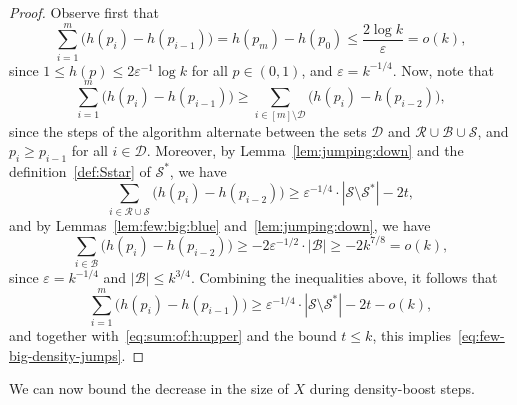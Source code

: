 \documentclass[12pt,reqno]{amsart}
\theoremstyle{definition}
\theoremstyle{remark}
\newcommand\cB{\mathcal{B}}
\def\cS{\mathcal{S}}
\newcommand\eps{\varepsilon}
\renewcommand{\le}{\leqslant}
\renewcommand{\ge}{\geqslant}
\def\eps{\varepsilon}
\def\cD{\mathcal{D}}
\def\cR{\mathcal{R}}
\def\cB{\mathcal{B}}
\begin{document}
\begin{proof}%
Observe first that
\begin{equation}\label{eq:sum:of:h:upper}
\sum_{i = 1}^m \big( h(p_i) - h(p_{i-1}) \big) = h(p_m) - h(p_0) \le \frac{2\log k}{\eps} = o(k),
\end{equation}
since $1 \le h(p) \le 2\eps^{-1} \log k$ for all $p \in (0,1)$, and $\eps = k^{-1/4}$. Now, note that 
\begin{equation}\label{eq:sum:of:h:notD}
\sum_{i = 1}^m \big( h(p_i) - h(p_{i-1}) \big) \ge \sum_{i \in [m] \setminus \cD}  \big( h(p_{i}) - h(p_{i-2}) \big),
\end{equation}
since the steps of the algorithm alternate between the sets $\cD$ and $\cR \cup \cB \cup \cS$, and $p_i \ge p_{i-1}$ for all $i \in \cD$. Moreover, by Lemma~\ref{lem:jumping:down} and the definition~\eqref{def:Sstar} of $\cS^*$, we have
\begin{equation}\label{eq:sum:of:h:RS}
\sum_{i \in \cR \cup \cS} \big( h(p_i) - h(p_{i-2}) \big) \ge \eps^{-1/4} \cdot |\cS \setminus \cS^*| - 2t,
\end{equation}
and by Lemmas~\ref{lem:few:big:blue} and~\ref{lem:jumping:down}, we have
\begin{equation}\label{eq:sum:of:h:B}
\sum_{i \in \cB} \big( h(p_i) - h(p_{i-2}) \big) \ge - 2 \eps^{-1/2} \cdot |\cB| \ge - 2k^{7/8} = o(k),
\end{equation}
since $\eps = k^{-1/4}$ and $|\cB| \le k^{3/4}$. Combining the inequalities above, it follows that 
$$\sum_{i = 1}^m \big( h(p_i) - h(p_{i-1}) \big) \ge \eps^{-1/4} \cdot |\cS \setminus \cS^*| - 2t - o(k),$$ 
and together with~\eqref{eq:sum:of:h:upper} and the bound $t \le k$, this implies~\eqref{eq:few-big-density-jumps}. 
\end{proof}

We can now bound the decrease in the size of $X$ during density-boost steps.  
\end{document}
